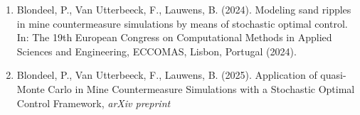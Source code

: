 \documentclass[12pt,lettersize,oneside]{book} %
\begin{document}
\begin{talk}
\medskip
\begin{enumerate}
 \item[{[1]}] Blondeel, P., Van Utterbeeck, F., Lauwens, B. (2024). Modeling sand ripples in mine countermeasure simulations by means of stochastic optimal control. In: The 19th European Congress on Computational Methods in Applied Sciences and Engineering, ECCOMAS, Lisbon, Portugal (2024).
 \item[{[2]}] Blondeel, P., Van Utterbeeck, F., Lauwens, B. (2025).  Application of quasi-Monte Carlo in Mine Countermeasure Simulations with a Stochastic Optimal Control Framework, \textit{arXiv preprint}
\end{enumerate}

\end{talk}
\end{document}
